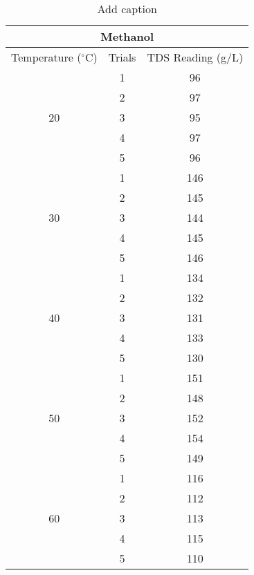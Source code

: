 \newpage

\begin{table}[H]
  \centering
  \caption{Add caption}
    \begin{tabular}{ccc}
    \toprule
    \multicolumn{3}{c}{Methanol} \\
    \midrule
    Temperature ($^\circ$C) & Trials & TDS Reading (g/L)  \\
    \midrule
    \multirow{5}[10]{*}{20} & 1     & 96 \\
\cmidrule{2-3}          & 2     & 97 \\
\cmidrule{2-3}          & 3     & 95 \\
\cmidrule{2-3}          & 4     & 97 \\
\cmidrule{2-3}          & 5     & 96 \\
    \midrule
    \multirow{5}[10]{*}{30} & 1     & 146 \\
\cmidrule{2-3}          & 2     & 145 \\
\cmidrule{2-3}          & 3     & 144 \\
\cmidrule{2-3}          & 4     & 145 \\
\cmidrule{2-3}          & 5     & 146 \\
    \midrule
    \multirow{5}[10]{*}{40} & 1     & 134 \\
\cmidrule{2-3}          & 2     & 132 \\
\cmidrule{2-3}          & 3     & 131 \\
\cmidrule{2-3}          & 4     & 133 \\
\cmidrule{2-3}          & 5     & 130 \\
    \midrule
    \multirow{5}[10]{*}{50} & 1     & 151 \\
\cmidrule{2-3}          & 2     & 148 \\
\cmidrule{2-3}          & 3     & 152 \\
\cmidrule{2-3}          & 4     & 154 \\
\cmidrule{2-3}          & 5     & 149 \\
    \midrule
    \multirow{5}[10]{*}{60} & 1     & 116 \\
\cmidrule{2-3}          & 2     & 112 \\
\cmidrule{2-3}          & 3     & 113 \\
\cmidrule{2-3}          & 4     & 115 \\
\cmidrule{2-3}          & 5     & 110 \\
    \bottomrule
    \end{tabular}%
  \label{tab:addlabel}%
\end{table}%

